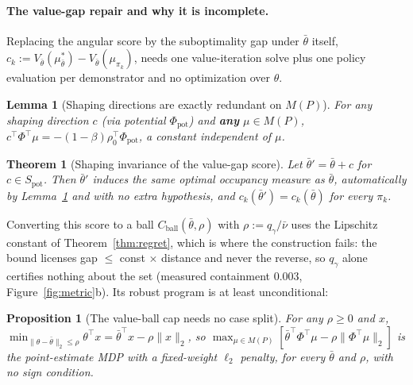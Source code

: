 \documentclass{article}
\newtheorem{theorem}{Theorem}
\newtheorem{proposition}{Proposition}
\newtheorem{lemma}{Lemma}
\begin{document}
\paragraph{The value-gap repair and why it is incomplete.} Replacing the
angular score by the suboptimality gap under $\bar\theta$ itself,
$c_k:=V_{\bar\theta}(\mu^*_{\bar\theta})-V_{\bar\theta}(\mu_{\pi_k})$, needs one
value-iteration solve plus one policy evaluation per demonstrator and no
optimization over $\theta$.

\begin{lemma}[Shaping directions are exactly redundant on $M(P)$]
\label{lem:shaping-redundant}
For any shaping direction $c$ (via potential $\Phi_{\mathrm{pot}}$) and
\textbf{any} $\mu\in M(P)$, $c^\top\Phi^\top\mu=-(1-\beta)\rho_0^\top\Phi_{\mathrm{pot}}$,
a constant independent of $\mu$.
\end{lemma}

\begin{theorem}[Shaping invariance of the value-gap score]
\label{thm:vg-shaping}
Let $\bar\theta'=\bar\theta+c$ for $c\in S_{\mathrm{pot}}$. Then $\bar\theta'$
induces the same optimal occupancy measure as $\bar\theta$, automatically by
Lemma~\ref{lem:shaping-redundant} and with no extra hypothesis, and
$c_k(\bar\theta')=c_k(\bar\theta)$ for every $\pi_k$.
\end{theorem}

Converting this score to a ball $C_{\mathrm{ball}}(\bar\theta,\rho)$ with
$\rho:=q_\gamma/\bar\nu$ uses the Lipschitz constant of
Theorem~\ref{thm:regret}, which is where the construction fails: the bound
licenses gap $\le$ const $\times$ distance and never the reverse, so $q_\gamma$
alone certifies nothing about the set (measured containment $0.003$,
Figure~\ref{fig:metric}b). Its robust program is at least unconditional:

\begin{proposition}[The value-ball cap needs no case split]
\label{prop:ball-regularizer}
For any $\rho\ge0$ and $x$,
$\min_{\|\theta-\bar\theta\|_2\le\rho}\theta^\top x=\bar\theta^\top x-\rho\|x\|_2$,
so $\max_{\mu\in M(P)}[\bar\theta^\top\Phi^\top\mu-\rho\|\Phi^\top\mu\|_2]$ is
the point-estimate MDP with a fixed-weight $\ell_2$ penalty, for every
$\bar\theta$ and $\rho$, with no sign condition.
\end{proposition}
\end{document}
